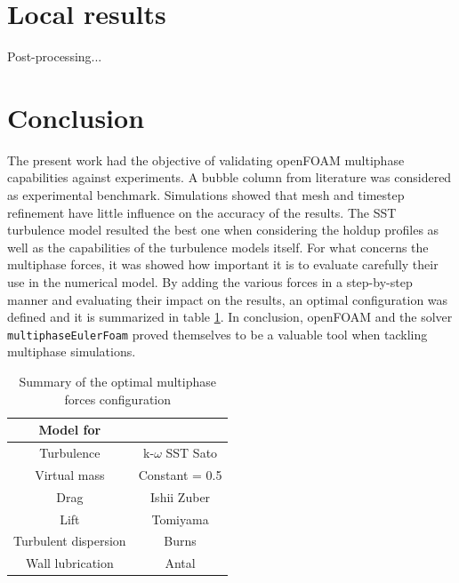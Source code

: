 \documentclass[11pt,a4paper]{article}
\begin{document}
\section{Local results}
\label{sec:localresults}

Post-processing...



\section{Conclusion}
\label{sec:Conclusion}

The present work had the objective of validating openFOAM multiphase capabilities against experiments. A bubble column from literature was considered as experimental benchmark. Simulations showed that mesh and timestep refinement have little influence on the accuracy of the results. The SST turbulence model resulted the best one when considering the holdup profiles as well as the capabilities of the turbulence models itself. For what concerns the multiphase forces, it was showed how important it is to evaluate carefully their use in the numerical model. By adding the various forces in a step-by-step manner and evaluating their impact on the results, an optimal configuration was defined and it is summarized in table \ref{tab:optimalconfig}. In conclusion, openFOAM and the solver \texttt{multiphaseEulerFoam} proved themselves to be a valuable tool when tackling multiphase simulations.



\begin{table}[H]
  \centering
    \begin{tabular}{| c c |}
    \hline
    \rowcolor{bluePoli!40}
    \textbf{Model for} &  \T\B \\
     \hline \hline 
    Turbulence & k-$\omega$ SST Sato \cite{SSTSato} \T\B \\
    Virtual mass & Constant = 0.5 \T\B \\
    Drag & Ishii Zuber \cite{ishiizuber} \T\B \\
    Lift & Tomiyama \cite{tomiyamalift} \T\B \\  
    Turbulent dispersion & Burns \cite{burns} \T\B \\   
    Wall lubrication & Antal \cite{antal} \T\B \\ 
    \hline
    \end{tabular}%
  \caption{Summary of the optimal multiphase forces configuration}
  \label{tab:optimalconfig}%
\end{table}%
\end{document}
